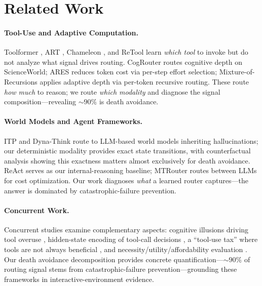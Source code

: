 \section{Related Work}

\paragraph{Tool-Use and Adaptive Computation.}
Toolformer \cite{toolformer-2024}, ART \cite{art-2023}, Chameleon \cite{chameleon-2024}, and ReTool \cite{retool-2026} learn \emph{which tool} to invoke but do not analyze what signal drives routing.
CogRouter \cite{cogrouter-2026} routes cognitive depth on ScienceWorld; ARES \cite{ares-2026} reduces token cost via per-step effort selection; Mixture-of-Recursions \cite{mixture-of-recursions-2025} applies adaptive depth via per-token recursive routing.
These route \emph{how much} to reason; we route \emph{which modality} and diagnose the signal composition---revealing ${\sim}90\%$ is death avoidance.

\paragraph{World Models and Agent Frameworks.}
ITP \cite{itp-2026} and Dyna-Think \cite{dynathink-2025} route to LLM-based world models inheriting hallucinations; our deterministic modality provides exact state transitions, with counterfactual analysis showing this exactness matters almost exclusively for death avoidance.
ReAct \cite{react-2023} serves as our internal-reasoning baseline; MTRouter \cite{mtrouter-2026} routes between LLMs for cost optimization.
Our work diagnoses \emph{what} a learned router captures---the answer is dominated by catastrophic-failure prevention.

\paragraph{Concurrent Work.}
Concurrent studies examine complementary aspects: cognitive illusions driving tool overuse \cite{tool-overuse-illusion-2026}, hidden-state encoding of tool-call decisions \cite{when2tool-2026}, a ``tool-use tax'' where tools are not always beneficial \cite{tool-use-tax-2026}, and necessity/utility/affordability evaluation \cite{to-call-or-not-2026}. Our death avoidance decomposition provides concrete quantification---${\sim}90\%$ of routing signal stems from catastrophic-failure prevention---grounding these frameworks in interactive-environment evidence.
